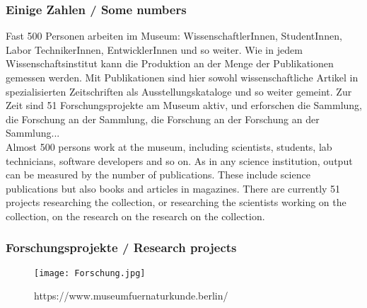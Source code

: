 {\scriptsize
\begin{frame}
  \frametitle{ Einige Zahlen / \textcolor{mfn_green}{Some numbers}}
  Fast 500 Personen arbeiten im Museum: WissenschaftlerInnen, StudentInnen, Labor TechnikerInnen, EntwicklerInnen und so weiter. Wie in jedem Wissenschaftsinstitut kann die Produktion an der Menge der Publikationen gemessen werden. Mit Publikationen sind hier sowohl wissenschaftliche Artikel in spezialisierten Zeitschriften als Ausstellungskataloge und so weiter gemeint. Zur Zeit sind 51 Forschungsprojekte am Museum aktiv, und erforschen die Sammlung, die Forschung an der Sammlung, die Forschung an der Forschung an der Sammlung...\\
  \bigskip  
  \textcolor{mfn_green}{Almost 500 persons work at the museum, including scientists, students, lab technicians, software developers and so on. As in any science institution, output can be measured by the number of publications. These include science publications but also books and articles in magazines. There are currently 51 projects researching the collection, or researching the scientists working on the collection, on the research on the research on the collection.}
\end{frame}
}
\begin{frame}
  \frametitle{Forschungsprojekte / \textcolor{mfn_green}{Research projects}}
  \begin{figure}
  \texttt{[image: Forschung.jpg]}
  \caption{https://www.museumfuernaturkunde.berlin/}
  \end{figure}
\end{frame}

